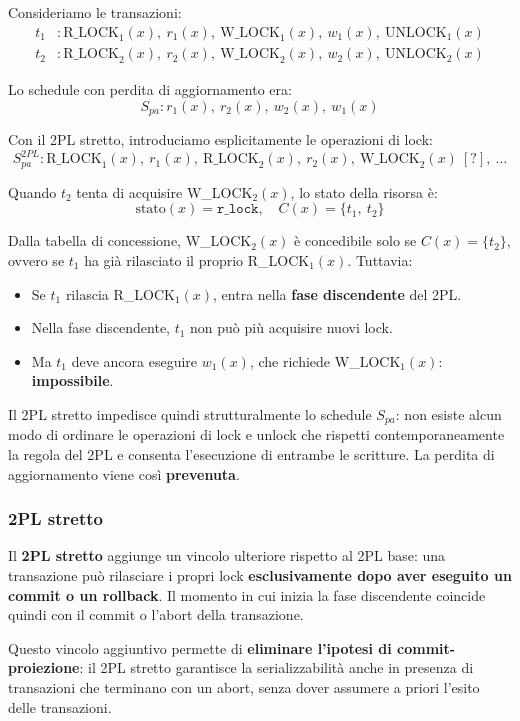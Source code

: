 Consideriamo le transazioni:
\begin{align*}
	t_1 &: \text{R\_LOCK}_1(x),\ r_1(x),\ \text{W\_LOCK}_1(x),\ w_1(x),\ \text{UNLOCK}_1(x) \\
	t_2 &: \text{R\_LOCK}_2(x),\ r_2(x),\ \text{W\_LOCK}_2(x),\ w_2(x),\ \text{UNLOCK}_2(x)
\end{align*}

Lo schedule con perdita di aggiornamento era:
\[
S_{pa} : r_1(x),\ r_2(x),\ w_2(x),\ w_1(x)
\]

Con il 2PL stretto, introduciamo esplicitamente le operazioni di lock:
\[
S_{pa}^{2PL} : \text{R\_LOCK}_1(x),\ r_1(x),\ \text{R\_LOCK}_2(x),\ r_2(x),\ \text{W\_LOCK}_2(x)\ [\text{?}],\ \ldots
\]

Quando $t_2$ tenta di acquisire W\_LOCK$_2(x)$, lo stato della risorsa è:
\[
\text{stato}(x) = \texttt{r\_lock}, \quad C(x) = \{t_1,\ t_2\}
\]

Dalla tabella di concessione, W\_LOCK$_2(x)$ è concedibile solo se $C(x) = \{t_2\}$, ovvero se $t_1$ ha già rilasciato il proprio R\_LOCK$_1(x)$. Tuttavia:

\begin{itemize}
	\item Se $t_1$ rilascia R\_LOCK$_1(x)$, entra nella \textbf{fase discendente} del 2PL.
	\item Nella fase discendente, $t_1$ non può più acquisire nuovi lock.
	\item Ma $t_1$ deve ancora eseguire $w_1(x)$, che richiede W\_LOCK$_1(x)$: \textbf{impossibile}.
\end{itemize}

Il 2PL stretto impedisce quindi strutturalmente lo schedule $S_{pa}$: non esiste alcun modo di ordinare le operazioni di lock e unlock che rispetti contemporaneamente la regola del 2PL e consenta l'esecuzione di entrambe le scritture. La perdita di aggiornamento viene così \textbf{prevenuta}.
\subsubsection{2PL stretto}

Il \textbf{2PL stretto} aggiunge un vincolo ulteriore rispetto al 2PL base: una transazione può rilasciare i propri lock \textbf{esclusivamente dopo aver eseguito un commit o un rollback}. Il momento in cui inizia la fase discendente coincide quindi con il commit o l'abort della transazione.

Questo vincolo aggiuntivo permette di \textbf{eliminare l'ipotesi di commit-proiezione}: il 2PL stretto garantisce la serializzabilità anche in presenza di transazioni che terminano con un abort, senza dover assumere a priori l'esito delle transazioni.

